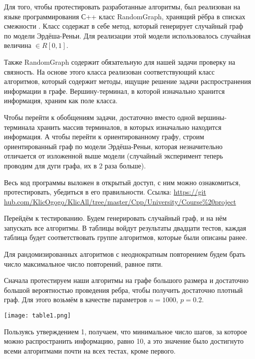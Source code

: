 Для того, чтобы протестировать разработанные алгоритмы, был реализован на языке программирования С++ класс RandomGraph, хранящий рёбра в списках смежности . Класс содержат в себе метод, который генерирует случайный граф по модели Эрдёша-Реньи. Для реализации этой модели использовалось случайная величина $\in R[0,1]$. 

Также RandomGraph содержит обязательную для нашей задачи проверку на связность. На основе этого класса реализован соответствующий класс алгоритмов, который содержит методы, ищущие решение задачи распространения информации в графе. Вершину-терминал, в которой изначально хранится информация, храним как поле класса.

Чтобы перейти к обобщениям задачи, достаточно вместо одной вершины-терминала хранить массив терминалов, в которых изначально находится информация. А чтобы перейти к ориентированному графу, строим ориентированный граф по модели Эрдёша-Реньи, которая незначительно отличается от изложенной выше модели (случайный эксперимент теперь проводим для дуги графа, их в 2 раза больше).

Весь код программы выложен в открытый доступ, с ним можно ознакомиться, протестировать, убедиться в его правильности. Ссылка:
\href{https://github.com/KlicOgogo/KlicAll/tree/master/Cpp/University/Course\%20project}{https://git hub.com/KlicOgogo/KlicAll/tree/master/Cpp/University/Course\%20project}
	
Перейдём к тестированию. Будем генерировать случайный граф, и на нём запускать все алгоритмы. В таблицы войдут результаты двадцати тестов, каждая таблица будет соответствовать группе алгоритмов, которые были описаны ранее.

Для рандомизированных алгоритмов с неоднократным повторением будем брать число максимальное число повторений, равное пяти.

Сначала протестируем наши алгоритмы на графе большого размера и достаточно большой вероятностью проведения ребра, чтобы получить достаточно плотный граф. Для этого возьмём в качестве параметров $n = 1000$, $p = 0.2$.

\setcounter{figure}{0}
\begin{table}[H]
	\begin{center}
		\texttt{[image: table1.png]}
		\caption{$n = 1000$, $p = 0.2$}
	\end{center}
\end{table}

Пользуясь утверждением 1, получаем, что минимальное число шагов, за которое можно распространить информацию, равно 10, а это значение было достигнуто всеми алгоритмами почти на всех тестах, кроме первого.

